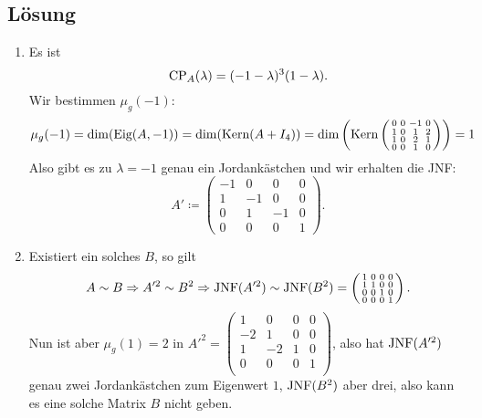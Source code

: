 \subsection{Lösung}
\begin{enumerate}
	\item Es ist
	\begin{equation*}
	 	\text{CP}_A(\lambda) = (-1-\lambda)^3(1-\lambda)\text{.}
	 \end{equation*}
	 Wir bestimmen \( \mu_g(-1) \):
	 \begin{equation*}
	 	\mu_g(-1) = \dim(\text{Eig}(A, -1)) = \dim(\text{Kern}(A + I_4)) = \dim\left( \text{Kern} \left( \begin{smallmatrix}
	 		0 & 0 & -1 & 0 \\
	 		1 & 0 & 1 & 2 \\
	 		1 & 0 & 2 & 1 \\
	 		0 & 0 & 1 & 0
	 	\end{smallmatrix} \right) \right) = 1
	 \end{equation*}
	 Also gibt es zu \( \lambda = -1 \) genau ein Jordankästchen und wir erhalten die JNF:
	 \begin{equation*}
	 	A' \coloneqq \left( \begin{smallmatrix}
	 		-1 & 0 & 0 & 0 \\
	 		1 & -1 & 0 & 0 \\
	 		0 & 1 & -1 & 0 \\
	 		0 & 0 & 0 & 1
	 	\end{smallmatrix} \right)\text{.}
	 \end{equation*}

	 \item Existiert ein solches \( B \), so gilt
	 \begin{equation*} 
	 	A \sim B \Rightarrow A'^2 \sim B^2 \Rightarrow \text{JNF}(A'^2) \sim \text{JNF}(B^2) = \left( \begin{smallmatrix}
	 		1 & 0 & 0 & 0 \\
	 		1 & 1 & 0 & 0 \\
	 		0 & 0 & 1 & 0 \\
	 		0 & 0 & 0 & 1
	 	\end{smallmatrix} \right)\text{.}
	 \end{equation*}
	 Nun ist aber \( \mu_g(1) = 2 \) in \( A'^2 = \left( \begin{smallmatrix}
	 	1 & 0 & 0 & 0 \\
	 	-2 & 1 & 0 & 0 \\
	 	1 & -2 & 1 & 0 \\
	 	0 & 0 & 0 & 1 \\
	 \end{smallmatrix} \right) \), also hat \( \text{JNF}(A'^2) \) genau zwei Jordankästchen zum Eigenwert \( 1 \), \( \text{JNF}(B^2) \) aber drei, also kann es eine solche Matrix \( B \) nicht geben.
\end{enumerate}

